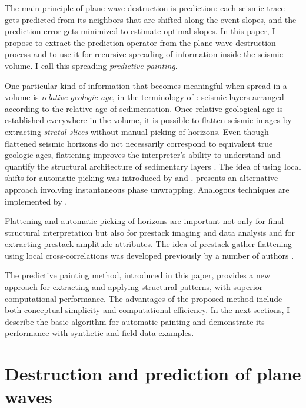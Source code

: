 The main principle of plane-wave destruction is prediction: each
seismic trace gets predicted from its neighbors that are shifted along
the event slopes, and the prediction error gets minimized to estimate
optimal slopes. In this paper, I propose to extract the prediction
operator from the plane-wave destruction process and to use it for
recursive spreading of information inside the seismic volume. I call
this spreading \emph{predictive painting}.

One particular kind of information that becomes meaningful when spread
in a volume is \emph{relative geologic age}, in the terminology of
\cite{stark}: seismic layers arranged according to the relative age of
sedimentation. Once relative geological age is established everywhere
in the volume, it is possible to flatten seismic images by extracting
\emph{stratal slices} \cite[]{GEO63-02-05020513} without manual
picking of horizons. Even though flattened seismic horizons do not
necessarily correspond to equivalent true geologic ages, flattening
improves the interpreter's ability to understand and quantify the
structural architecture of sedimentary layers \cite[]{zeng}.  The idea
of using local shifts for automatic picking was introduced by
\cite{bienati} and \cite{lomask}. \cite{SEG-2003-50195022}
presents an alternative approach involving instantaneous
phase unwrapping. Analogous techniques are implemented by \cite[]{ssis,ssis2}.

Flattening and automatic picking of horizons are important not only
for final structural interpretation but also for prestack imaging and
data analysis and for extracting prestack amplitude attributes. The
idea of prestack gather flattening using local
cross-corre\-la\-ti\-ons was developed previously by a number of
authors \cite[]{exxon,sintef,gulunay2,gulunay}. 

The predictive painting method, introduced in this paper, provides a
new approach for extracting and applying structural patterns, with
superior computational performance. The advantages of the
proposed method include both conceptual simplicity and computational
efficiency. In the next sections, I describe the basic algorithm for
automatic painting and demonstrate its performance with synthetic and
field data examples.

\section{Destruction and prediction of plane waves}

